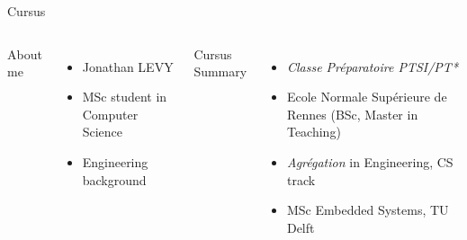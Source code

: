 
\begin{frame}{Cursus}
	\begin{columns}
		\begin{center}
			About me
		\end{center}
			\begin{itemize}
				\item Jonathan LEVY
				\item MSc student in Computer Science
				\item Engineering background
			\end{itemize}
		\begin{center}
			Cursus Summary
		\end{center}
		\begin{itemize}
			\item \emph{Classe Préparatoire PTSI/PT*}
			\item Ecole Normale Supérieure de Rennes (BSc, Master in Teaching)
			\item \emph{Agrégation} in Engineering, CS track
			\item MSc Embedded Systems, TU Delft
		\end{itemize}
	\end{columns}
\end{frame}